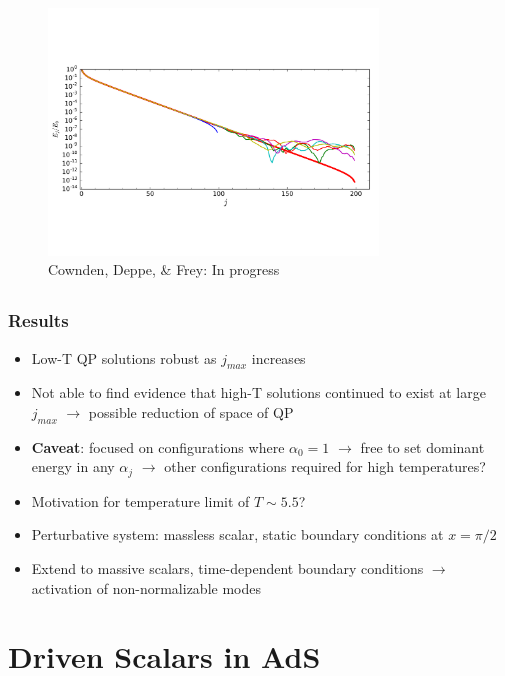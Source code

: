\documentclass[mathserif,10pt]{beamer}
\newcommand{\bi}{\begin{itemize}}
\newcommand{\ei}{\end{itemize}}
\newcommand{\its}{\item}
\newcommand{\scr}{\scriptsize}
\newcommand{\jm}{j_{max}}
\begin{document}
{{\begin{overlayarea}{\textwidth}{0.65\textheight}
\begin{figure}
{      \includegraphics[width=0.78\textwidth]{TTFEvo} \\ {\scr Cownden, Deppe, \& Frey: In progress}
      }
      \end{figure}
  \end{overlayarea}
}


\subsection*{}
\frame
{
  \frametitle{Results}
    \bi
    \its Low-T QP solutions robust as $\jm$ increases
    \its Not able to find evidence that high-T solutions continued to exist at large $\jm$ $\to$ possible reduction of space of QP
    \its {\bf Caveat}: focused on configurations where $\alpha_0 = 1$ $\to$ free to set dominant energy in any $\alpha_j$ $\to$ other configurations required for high temperatures?
    \its Motivation for temperature limit of $T \sim 5.5$?
    \its Perturbative system: massless scalar, static boundary conditions at $x = \pi/2$
    \its Extend to massive scalars, time-dependent boundary conditions $\to$ activation of non-normalizable modes
    \ei
}


\section{Driven Scalars in AdS}

}
\end{document}
